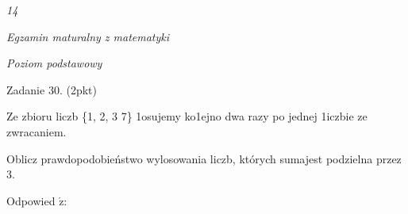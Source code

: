 \documentclass[a4paper,12pt]{article}
\begin{document}
{\it 14}

{\it Egzamin maturalny z matematyki}

{\it Poziom podstawowy}

Zadanie 30. (2pkt)

Ze zbioru liczb \{1, 2, 3 7\} 1osujemy ko1ejno dwa razy po jednej 1iczbie ze zwracaniem.

Oblicz prawdopodobieństwo wylosowania liczb, których sumajest podzielna przez 3.

Odpowied $\acute{\mathrm{z}}$:
\end{document}
